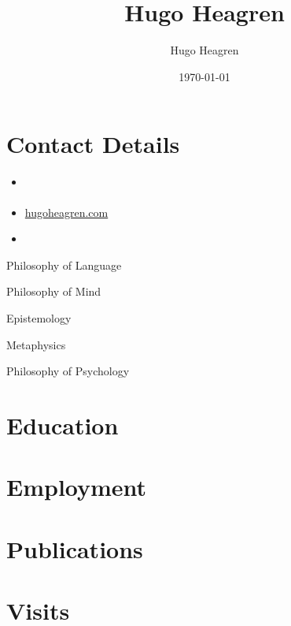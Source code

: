 \documentclass{cv}
\author{Hugo Heagren}
\date{\today}
\title{Hugo Heagren}
\begin{document}
\maketitle
\nocite{*}

\section*{Contact Details}
\begin{itemize}
\item \href{mailto:\directlua{tex.sprint{info['email']}}}{}
\item \href{https://hugoheagren.com}{hugoheagren.com}
\item {}
\end{itemize}

\begin{areas}
\item[{AOS}]%
  \begin{area}
  \item Philosophy of Language
  \item Philosophy of Mind
  \end{area}
\item[{AOC}]%
  \begin{area}
  \item Epistemology
  \item Metaphysics
  \item Philosophy of Psychology
\end{area}
\end{areas}

\section*{Education}
\printbibliography[check=Education]{}

\section*{Employment}
\printbibliography[check=Post]{}

\section*{Publications }
\printbibliography[check=Publication]{}

\section*{Visits}
\printbibliography[check=Visit]{}
\end{document}
